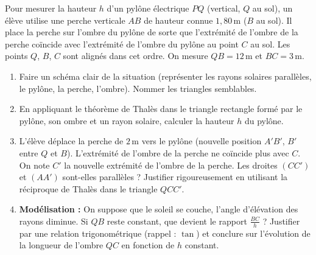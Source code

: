 \documentclass[11pt]{article}
\begin{document}
\begin{exercice}
Pour mesurer la hauteur $h$ d'un pylône électrique $PQ$ (vertical, $Q$ au sol), un élève utilise une perche verticale $AB$ de hauteur connue $1,80\,\text{m}$ ($B$ au sol). Il place la perche sur l'ombre du pylône de sorte que l'extrémité de l'ombre de la perche coïncide avec l'extrémité de l'ombre du pylône au point $C$ au sol. Les points $Q$, $B$, $C$ sont alignés dans cet ordre. On mesure $QB = 12\,\text{m}$ et $BC = 3\,\text{m}$.
\begin{enumerate}
    \item Faire un schéma clair de la situation (représenter les rayons solaires parallèles, le pylône, la perche, l'ombre). Nommer les triangles semblables.
    \item En appliquant le théorème de Thalès dans le triangle rectangle formé par le pylône, son ombre et un rayon solaire, calculer la hauteur $h$ du pylône.
    \item L'élève déplace la perche de $2\,\text{m}$ vers le pylône (nouvelle position $A'B'$, $B'$ entre $Q$ et $B$). L'extrémité de l'ombre de la perche ne coïncide plus avec $C$. On note $C'$ la nouvelle extrémité de l'ombre de la perche. Les droites $(CC')$ et $(AA')$ sont-elles parallèles ? Justifier rigoureusement en utilisant la réciproque de Thalès dans le triangle $QCC'$.
    \item \textbf{Modélisation :} On suppose que le soleil se couche, l'angle d'élévation des rayons diminue. Si $QB$ reste constant, que devient le rapport $\frac{BC}{h}$ ? Justifier par une relation trigonométrique (rappel : $\tan$) et conclure sur l'évolution de la longueur de l'ombre $QC$ en fonction de $h$ constant.
\end{enumerate}
\end{exercice}
\end{document}
